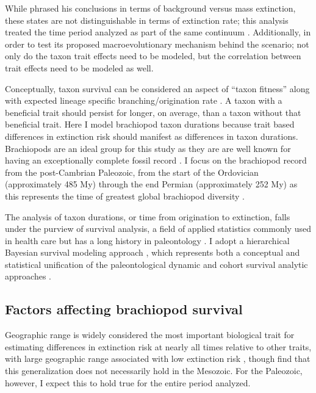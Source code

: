 \documentclass{article}
\begin{document}
While \citet{Jablonski1986} phrased his conclusions in terms of background versus mass extinction, these states are not distinguishable in terms of extinction rate; this analysis treated the time period analyzed as part of the same continuum \citep{Wang2003,Payne2007,Simpson2009}. Additionally, in order to test its proposed macroevolutionary mechanism behind the \citet{Jablonski1986} scenario; not only do the taxon trait effects need to be modeled, but the correlation between trait effects need to be modeled as well. 

Conceptually, taxon survival can be considered an aspect of ``taxon fitness'' along with expected lineage specific branching/origination rate \citep{Cooper1984,Palmer2012}. A taxon with a beneficial trait should persist for longer, on average, than a taxon without that beneficial trait. Here I model brachiopod taxon durations because trait based differences in extinction risk should manifest as differences in taxon durations. Brachiopods are an ideal group for this study as they are are well known for having an exceptionally complete fossil record \citep{Foote1996e,Foote2000a}. I focus on the brachiopod record from the post-Cambrian Paleozoic, from the start of the Ordovician (approximately 485 My) through the end Permian (approximately 252 My) as this represents the time of greatest global brachiopod diversity \citep{Alroy2010}.

The analysis of taxon durations, or time from origination to extinction, falls under the purview of survival analysis, a field of applied statistics commonly used in health care \citep{Klein2003} but has a long history in paleontology \citep{Simpson1944,Simpson1953,VanValen1973,VanValen1979,Smits2015,Crampton2016}. I adopt a hierarchical Bayesian survival modeling approach \citep{Gelman2007,Gelman2013d,Klein2003}, which represents both a conceptual and statistical unification of the paleontological dynamic and cohort survival analytic approaches \citep{VanValen1973,VanValen1979,Raup1978,Raup1975,Foote1988,Baumiller1993,Simpson2006,Smits2015,Crampton2016,Ezard2012b}.

\subsection{Factors affecting brachiopod survival}

Geographic range is widely considered the most important biological trait for estimating differences in extinction risk at nearly all times relative to other traits, with large geographic range associated with low extinction risk \citep{Jablonski1986,Jablonski1987,Jablonski2003,Payne2007,Jablonski2008a,Harnik2013,Finnegan2012a}, though \citet{Foote2013} find that this generalization does not necessarily hold in the Mesozoic. For the Paleozoic, however, I expect this to hold true for the entire period analyzed.
\end{document}

